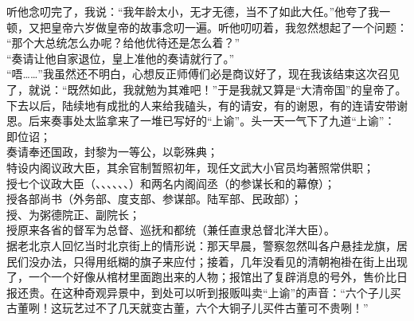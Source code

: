 听他念叨完了，我说：“我年龄太小，无才无德，当不了如此大任。”他夸了我一顿，又把皇帝六岁做皇帝的故事念叨一遍。听他叨叨着，我忽然想起了一个问题：\\

“那个大总统怎么办呢？给他优待还是怎么着？”\\

“奏请让他自家退位，皇上准他的奏请就行了。”\\

“唔……”我虽然还不明白，心想反正师傅们必是商议好了，现在我该结束这次召见了，就说：“既然如此，我就勉为其难吧！”于是我就又算是“大清帝国”的皇帝了。\\

下去以后，陆续地有成批的人来给我磕头，有的请安，有的谢恩，有的连请安带谢恩。后来奏事处太监拿来了一堆已写好的“上谕”。头一天一气下了九道“上谕”：\\

即位诏；\\

奏请奉还国政，封黎为一等公，以彰殊典；\\

特设内阁议政大臣，其余官制暂照初年，现任文武大小官员均著照常供职；\\

授七个议政大臣（、、、、、、）和两名内阁阎丞（的参谋长和的幕僚）；\\

授各部尚书（外务部、度支部、参谋部。陆军部、民政部）；\\

授、为粥德院正、副院长；\\

授原来各省的督军为总督、巡抚和都统（兼任直隶总督北洋大臣）。\\

据老北京人回忆当时北京街上的情形说：那天早晨，警察忽然叫各户悬挂龙旗，居民们没办法，只得用纸糊的旗子来应付；接着，几年没看见的清朝袍褂在街上出现了，一个一个好像从棺材里面跑出来的人物；报馆出了复辟消息的号外，售价比日报还贵。在这种奇观异景中，到处可以听到报贩叫卖“上谕”的声音：“六个子儿买古董咧！这玩艺过不了几天就变古董，六个大铜子儿买件古董可不贵咧！”\\

